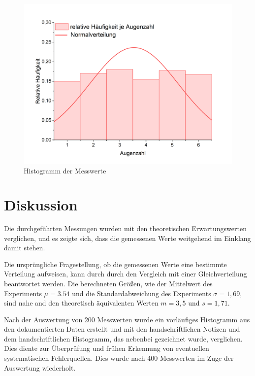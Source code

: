 \documentclass[a4paper,12pt]{article}
\begin{document}
\begin{figure}[H]
    \label{Abb2}
    \centering
    \includegraphics[width=\textwidth]{bilder/Histogramm.png}
    \caption{Histogramm der Messwerte}
\end{figure}

\section{Diskussion}

Die durchgeführten Messungen wurden mit den theoretischen Erwartungswerten verglichen, und es zeigte sich, 
dass die gemessenen Werte weitgehend im Einklang damit stehen.

Die ursprüngliche Fragestellung, ob die gemessenen Werte eine bestimmte Verteilung aufweisen, kann durch 
durch den Vergleich mit einer Gleichverteilung beantwortet werden.
Die berechneten Größen, wie der Mittelwert des Experiments $\mu=3.54$ und die 
Standardabweichung des Experiments $\sigma = 1,69$, sind nahe and den theoretisch äquivalenten Werten $m=3,5$ 
und $s=1,71$.

Nach der Auswertung von 200 Messwerten wurde ein vorläufiges Histogramm aus den dokumentierten Daten 
erstellt und mit den handschriftlichen Notizen und dem handschriftlichen Histogramm, das nebenbei 
gezeichnet wurde, verglichen. Dies diente zur Überprüfung und frühen Erkennung von eventuellen 
systematischen Fehlerquellen. Dies wurde nach 400 Messwerten im Zuge der Auswertung wiederholt.
\end{document}
